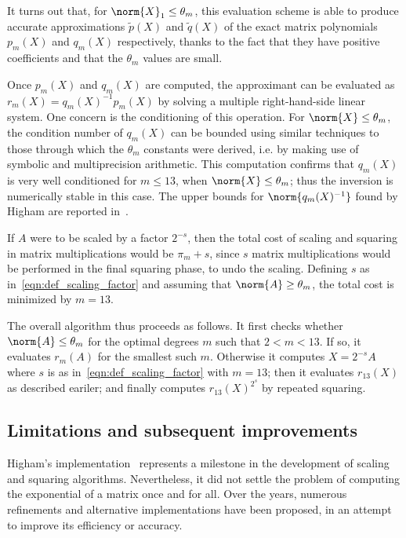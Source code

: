 \begin{oss*}
	It turns out that, for $\norm{X}_1\le\theta_m$, this evaluation scheme is able to produce accurate approximations $\tilde{p}(X)$ and $\tilde{q}(X)$ of the exact matrix polynomials $p_m(X)$ and $q_m(X)$ respectively, thanks to the fact that they have positive coefficients and that the $\theta_m$ values are small. 
\end{oss*}
Once $p_m(X)$ and $q_m(X)$ are computed, the approximant can be evaluated as $r_m(X)=q_m(X)^{-1}p_m(X)$ by solving a multiple right-hand-side linear system.
One concern is the conditioning of this operation. For $\norm{X}\le\theta_m$, the condition number of $q_m(X)$ can be bounded using similar techniques to those through which the $\theta_m$ constants were derived, i.e. by making use of symbolic and multiprecision arithmetic. This computation confirms that $q_m(X)$ is very well conditioned for $m\le13$, when $\norm{X}\le\theta_m$; thus the inversion is numerically stable in this case. The upper bounds for $\norm{q_m(X)^{-1}}$ found by Higham are reported in~\cite[Table~10.2]{higham:matfun_book}.

If $A$ were to be scaled by a factor $2^{-s}$, then the total cost of scaling and squaring in matrix multiplications would be $\pi_m+s$, since $s$ matrix multiplications would be performed in the final squaring phase, to undo the scaling. Defining $s$ as in~\eqref{eqn:def_scaling_factor} and assuming that $\norm{A}\ge\theta_m$, the total cost is minimized by $m=13$.

The overall algorithm thus proceeds as follows. It first checks whether $\norm{A}\le\theta_m$ for the optimal degrees $m$ such that $2<m<13$. If so, it evaluates $r_m(A)$ for the smallest such $m$.
Otherwise it computes $X=2^{-s}A$ where $s$ is as in~\eqref{eqn:def_scaling_factor} with $m=13$; then it evaluates $r_{13}(X)$ as described eariler; and finally computes $r_{13}(X)^{2^s}$ by repeated squaring.


\subsection{Limitations and subsequent improvements}\label{subs:sas_limitations_impr}
Higham's implementation~\cite{higham:SaS_revisited} represents a milestone in the development of scaling and squaring algorithms. Nevertheless, it did not settle the problem of computing the exponential of a matrix once and for all. Over the years, numerous refinements and alternative implementations have been proposed, in an attempt to improve its efficiency or accuracy.

